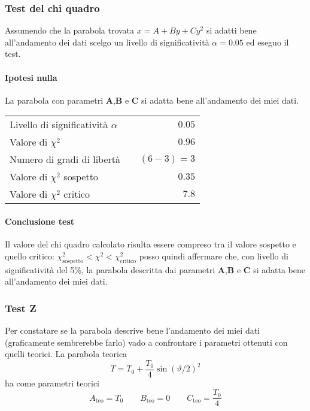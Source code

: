 \documentclass{article}
\begin{document}
\subsubsection{Test del chi quadro}
Assumendo che la parabola trovata $x=A+By+Cy^2$ si adatti bene all'andamento dei dati scelgo un livello di significatività $\alpha = 0.05$ ed eseguo il test.

\paragraph{Ipotesi nulla} La parabola con parametri \textbf{A},\textbf{B} e \textbf{C} si adatta bene all'andamento dei miei dati.

\vspace{0.7cm}
\begin{table}[H]
	\centering
	\begin{tabular}{lr} 
		Livello di significatività $\alpha$		&$\quad 0.05$  \\
		Valore di $\chi ^2$             		& $\quad 0.96$       \\
		Numero di gradi di libertà      		& $\quad (6-3) = 3$         \\   
		Valore di $\chi ^2$ sospetto			& $\quad 0.35$ \\
		Valore di $\chi ^2$ critico     		& $\quad 7.8$
	\end{tabular}
\end{table}
\vspace{0.7cm}

\paragraph{Conclusione test}
Il valore del chi quadro calcolato risulta essere compreso tra il valore sospetto e quello critico: $\chi^2_\text{sospetto} < \chi ^2 < \chi^2_\text{critico}$ posso quindi affermare che, con livello di significatività del 5\%, la parabola descritta dai parametri \textbf{A},\textbf{B} e \textbf{C} si adatta bene all'andamento dei miei dati.


\subsubsection{Test Z}
Per constatare se la parabola descrive bene l'andamento dei miei dati (graficamente sembrerebbe farlo) vado a confrontare i parametri ottenuti con quelli teorici. La parabola teorica 
\[
T = T_0 + \frac{T_0}{4}\sin{(\vartheta/2)}^2
\]
ha come parametri teorici
\[
A_\text{teo} = T_0 \qquad B_\text{teo} = 0 \qquad C_\text{teo} =  \frac{T_0}{4} 
\]
\end{document}
